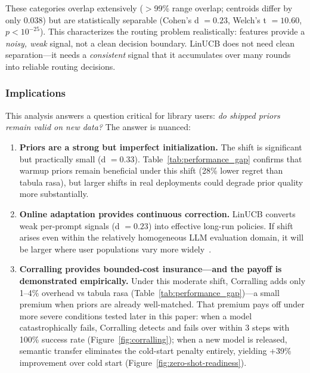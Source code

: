 \noindent These categories overlap extensively ($>$99\% range overlap; centroids differ by only 0.038) but are statistically separable (Cohen's d $= 0.23$, Welch's t $= 10.60$, $p < 10^{-25}$). This characterizes the routing problem realistically: features provide a \emph{noisy, weak} signal, not a clean decision boundary. LinUCB does not need clean separation---it needs a \emph{consistent} signal that it accumulates over many rounds into reliable routing decisions.

\subsubsection{Implications}

This analysis answers a question critical for library users: \emph{do shipped priors remain valid on new data?} The answer is nuanced:

\begin{enumerate}[leftmargin=*,noitemsep,topsep=2pt]
    \item \textbf{Priors are a strong but imperfect initialization.} The shift is significant but practically small (d $= 0.33$). Table~\ref{tab:performance_gap} confirms that warmup priors remain beneficial under this shift (28\% lower regret than tabula rasa), but larger shifts in real deployments could degrade prior quality more substantially.
    \item \textbf{Online adaptation provides continuous correction.} LinUCB converts weak per-prompt signals (d $= 0.23$) into effective long-run policies. If shift arises even within the relatively homogeneous LLM evaluation domain, it will be larger where user populations vary more widely~\cite{lu2018learning}.
    \item \textbf{Corralling provides bounded-cost insurance---and the payoff is demonstrated empirically.} Under this moderate shift, Corralling adds only 1--4\% overhead vs tabula rasa (Table~\ref{tab:performance_gap})---a small premium when priors are already well-matched. That premium pays off under more severe conditions tested later in this paper: when a model catastrophically fails, Corralling detects and fails over within 3 steps with 100\% success rate (Figure~\ref{fig:corralling}); when a new model is released, semantic transfer eliminates the cold-start penalty entirely, yielding +39\% improvement over cold start (Figure~\ref{fig:zero-shot-readiness}).
\end{enumerate}

